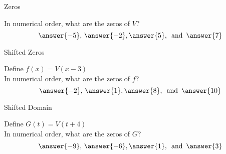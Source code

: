 \documentclass{ximera}
\begin{document}
\begin{exercise}
\begin{question} Zeros


In numerical order, what are the zeros of $V$? \\

\[
\answer{-5}, \, \answer{-2}, \answer{5}, \, \text{ and } \, \answer{7}
\]


\end{question}












\begin{question} Shifted Zeros 

Define $f(x) = V(x - 3)$ \\



In numerical order, what are the zeros of $f$? \\

\[
\answer{-2}, \, \answer{1}, \answer{8}, \, \text{ and } \, \answer{10}
\]


\end{question}















\begin{question} Shifted Domain 

Define $G(t) = V(t + 4)$ \\


In numerical order, what are the zeros of $G$? \\

\[
\answer{-9}, \, \answer{-6}, \answer{1}, \, \text{ and } \, \answer{3}
\]

\end{question}







\end{exercise}
\end{document}
